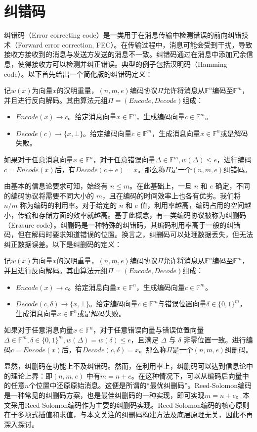 \section{纠错码}
\label{sec:preliminary-code}
纠错码（Error correcting code）是一类用于在消息传输中检测错误的前向纠错技术（Forward error correction, FEC）。在传输过程中，消息可能会受到干扰，导致接收方接收到的消息与发送方发送的消息不一致。纠错码通过在消息中添加冗余信息，使得接收方可以检测并纠正错误。典型的例子包括汉明码（Hamming code）。以下首先给出一个简化版的纠错码定义\cite{6772729}：

\begin{definition}[纠错码]
    记$w(x)$为向量$x$的汉明重量，$(n,m,e)$编码协议$\Pi$允许将消息从$\mathbb{F}^n$编码至$\mathbb{F}^m$，并且进行反向解码。其由算法元组$\Pi = (Encode, Decode)$组成：
    \begin{itemize}
        \item $Encode(x) \rightarrow c$。给定消息向量$x\in \mathbb{F}^n$，生成编码向量$c\in \mathbb{F}^m$。
        \item $Decode(c) \rightarrow \{x,\bot\}$。给定编码向量$c\in \mathbb{F}^m$，生成消息向量$x\in \mathbb{F}^n$或是解码失败。 
    \end{itemize}
    如果对于任意消息向量$x\in \mathbb{F}^n$，对于任意错误向量$\Delta\in \mathbb{F}^m, w(\Delta)\le e$，进行编码$c = Encode(x)$后，有$Decode(c+e) = x$。那么称$\Pi$是一个$(n,m,e)$纠错码。
\end{definition}

由基本的信息论要求可知，始终有 $n\le m$。在此基础上，一旦 $n$ 和 $e$ 确定，不同的编码协议将需要不同大小的 $m$，且在编码的时间效率上也各有优劣。我们将 $n/m$ 称为编码的利用率。对于给定的 $n$ 和 $e$ 值，利用率越高，编码占用的空间越小，传输和存储方面的效率就越高。基于此概念，有一类编码协议被称为纠删码（Erasure code）\cite{10.1145/263876.263881}。纠删码是一种特殊的纠错码，其编码利用率高于一般的纠错码，但在解码时要求知道错误的位置。换言之，纠删码可以处理数据丢失，但无法纠正数据误差。以下是纠删码的定义：

\begin{definition}[纠删码]
    记$w(x)$为向量$x$的汉明重量，$(n,m,e)$编码协议$\Pi$允许将消息从$\mathbb{F}^n$编码至$\mathbb{F}^m$，并且进行反向解码。其由算法元组$\Pi = (Encode, Decode)$组成：
    \begin{itemize}
        \item $Encode(x) \rightarrow c$。给定消息向量$x\in \mathbb{F}^n$，生成编码向量$c\in \mathbb{F}^m$。
        \item $Decode(c, \delta) \rightarrow \{x,\bot\}$。给定编码向量$c\in \mathbb{F}^m$与错误位置向量$\delta\in \{0,1\}^m$，生成消息向量$x\in \mathbb{F}^n$或是解码失败。
    \end{itemize}
    如果对于任意消息向量$x\in \mathbb{F}^n$，对于任意错误向量与错误位置向量$\Delta\in \mathbb{F}^m, \delta\in \{0,1\}^m, w(\Delta)=w(\delta)\le e$，且满足 $\Delta$ 与 $\delta$ 非零位置一致。进行编码$c = Encode(x)$后，有$Decode(c, \delta) = x$。那么称$\Pi$是一个$(n,m,e)$纠删码。
\end{definition}

显然，纠删码在功能上不及纠错码。然而，在利用率上，纠删码可以达到信息论中的理论上界：即$(n,m,e)$ 中有$m=n+e$。在这种情况下，可以从编码后向量中的任意$n$个位置中还原原始消息。这便是所谓的“最优纠删码”。Reed-Solomon编码是一种常见的纠删码方案，也是最佳纠删码的一种实现，即可实现$m=n+e$。本文采用Reed-Solomon编码作为主要的纠删码实现。Reed-Solomon编码的核心原则在于多项式插值和求值，与本文关注的纠删码构建方法及底层原理无关，因此不再深入探讨。
